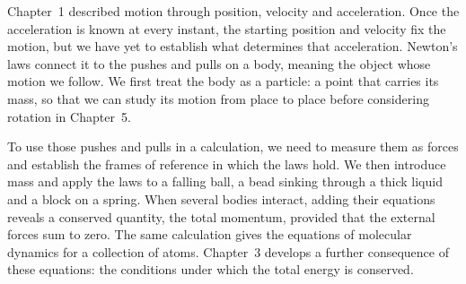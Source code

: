 Chapter~1 described motion through position, velocity and acceleration.
Once the acceleration is known at every instant, the starting position
and velocity fix the motion, but we have yet to establish what determines
that acceleration. Newton's laws connect it to the pushes and pulls on a
body, meaning the object whose motion we follow. We first treat the body
as a particle: a point that carries its mass, so that we can study its
motion from place to place before considering rotation in Chapter~5.

To use those pushes and pulls in a calculation, we need to measure them
as forces and establish the frames of reference in which the laws hold.
We then introduce mass and apply the laws to a falling ball, a bead sinking
through a thick liquid and a block on a spring. When several bodies
interact, adding their equations reveals a conserved quantity, the total
momentum, provided that the external forces sum to zero. The same
calculation gives the equations of molecular dynamics for a collection of
atoms. Chapter~3 develops a further consequence of these equations: the
conditions under which the total energy is conserved.
